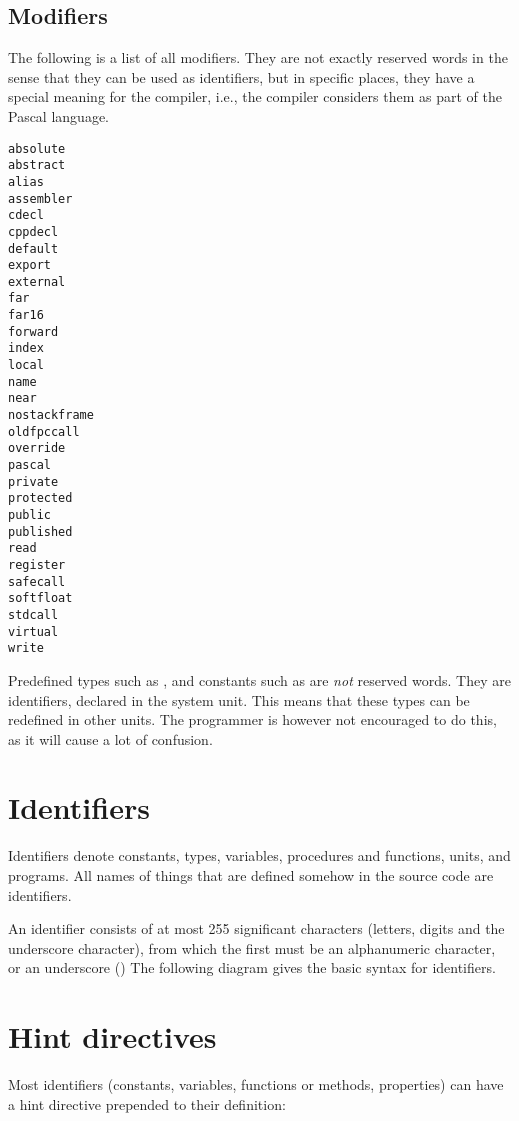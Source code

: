 \subsection{Modifiers}
The following is a list of all modifiers. They are not exactly reserved
words in the sense that they can be used as identifiers, but in specific
places, they have a special meaning for the compiler, i.e., the compiler
considers them as part of the Pascal language.
\begin{multicols}{4}
\begin{verbatim}
absolute
abstract
alias
assembler
cdecl
cppdecl
default
export
external
far
far16
forward
index
local
name
near
nostackframe
oldfpccall
override
pascal
private
protected
public
published
read
register
safecall
softfloat
stdcall
virtual
write
\end{verbatim}
\end{multicols}
\begin{remark}
Predefined types such as ,  and constants
such as  are {\em not} reserved words. They are
identifiers, declared in the system unit. This means that these types
can be redefined in other units. The programmer is however not
encouraged to do this, as it will cause a lot of confusion.
\end{remark}

\section{Identifiers}
Identifiers denote constants, types, variables, procedures and functions,
units, and programs. All names of things that are defined somehow in the
source code are identifiers.

An identifier consists of at most 255 significant characters (letters, digits and
the underscore character), from which the first must be an alphanumeric
character, or an underscore (\var{\_})
The following diagram gives the basic syntax for identifiers.


\section{Hint directives}
Most identifiers (constants, variables, functions or methods, properties) can have a 
hint directive prepended to their definition:

